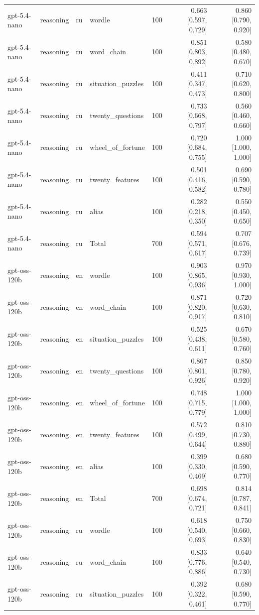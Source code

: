 \begin{longtable}{llllrrr}
gpt-5.4-nano & reasoning & ru & wordle & 100 & 0.663 [0.597, 0.729] & 0.860 [0.790, 0.920] \\
gpt-5.4-nano & reasoning & ru & word\_chain & 100 & 0.851 [0.803, 0.892] & 0.580 [0.480, 0.670] \\
gpt-5.4-nano & reasoning & ru & situation\_puzzles & 100 & 0.411 [0.347, 0.473] & 0.710 [0.620, 0.800] \\
gpt-5.4-nano & reasoning & ru & twenty\_questions & 100 & 0.733 [0.668, 0.797] & 0.560 [0.460, 0.660] \\
gpt-5.4-nano & reasoning & ru & wheel\_of\_fortune & 100 & 0.720 [0.684, 0.755] & 1.000 [1.000, 1.000] \\
gpt-5.4-nano & reasoning & ru & twenty\_features & 100 & 0.501 [0.416, 0.582] & 0.690 [0.590, 0.780] \\
gpt-5.4-nano & reasoning & ru & alias & 100 & 0.282 [0.218, 0.350] & 0.550 [0.450, 0.650] \\
gpt-5.4-nano & reasoning & ru & Total & 700 & 0.594 [0.571, 0.617] & 0.707 [0.676, 0.739] \\
gpt-oss-120b & reasoning & en & wordle & 100 & 0.903 [0.865, 0.936] & 0.970 [0.930, 1.000] \\
gpt-oss-120b & reasoning & en & word\_chain & 100 & 0.871 [0.820, 0.917] & 0.720 [0.630, 0.810] \\
gpt-oss-120b & reasoning & en & situation\_puzzles & 100 & 0.525 [0.438, 0.611] & 0.670 [0.580, 0.760] \\
gpt-oss-120b & reasoning & en & twenty\_questions & 100 & 0.867 [0.801, 0.926] & 0.850 [0.780, 0.920] \\
gpt-oss-120b & reasoning & en & wheel\_of\_fortune & 100 & 0.748 [0.715, 0.779] & 1.000 [1.000, 1.000] \\
gpt-oss-120b & reasoning & en & twenty\_features & 100 & 0.572 [0.499, 0.644] & 0.810 [0.730, 0.880] \\
gpt-oss-120b & reasoning & en & alias & 100 & 0.399 [0.330, 0.469] & 0.680 [0.590, 0.770] \\
gpt-oss-120b & reasoning & en & Total & 700 & 0.698 [0.674, 0.721] & 0.814 [0.787, 0.841] \\
gpt-oss-120b & reasoning & ru & wordle & 100 & 0.618 [0.540, 0.693] & 0.750 [0.660, 0.830] \\
gpt-oss-120b & reasoning & ru & word\_chain & 100 & 0.833 [0.776, 0.886] & 0.640 [0.540, 0.730] \\
gpt-oss-120b & reasoning & ru & situation\_puzzles & 100 & 0.392 [0.322, 0.461] & 0.680 [0.590, 0.770] \\

\end{longtable}
